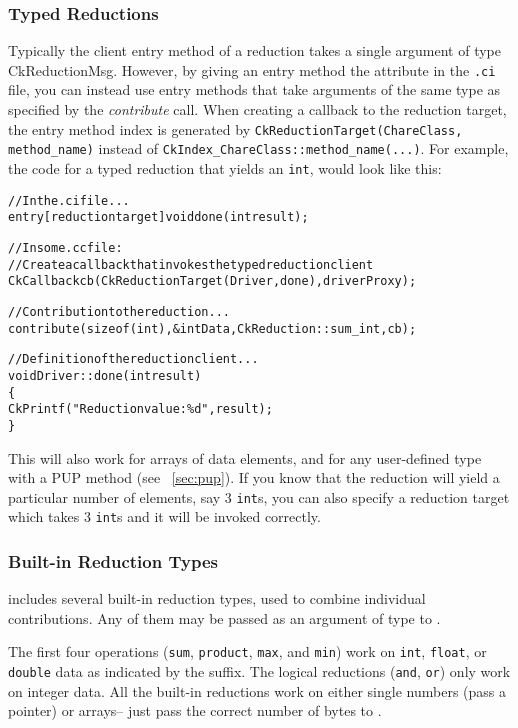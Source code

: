 \subsubsection{Typed Reductions}

\label{typed_reductions}

Typically the client entry method of a reduction takes a single argument of
type CkReductionMsg. However, by giving an entry method the
 attribute in the {\tt .ci} file, you can instead use entry methods that take
arguments of the same type as specified by the {\em contribute} call.  
When creating a callback to the
reduction target, the entry method index is generated by 
{\tt CkReductionTarget(ChareClass, method\_name)} 
instead of {\tt CkIndex\_ChareClass::method\_name(...)}.
For example,
the code for a typed reduction that yields an {\tt int}, would look like this:

\begin{alltt}
  // In the .ci file...
  entry [reductiontarget] void done(int result);

  // In some .cc file: 
  // Create a callback that invokes the typed reduction client
  CkCallback cb(CkReductionTarget(Driver,done), driverProxy);

  // Contribution to the reduction...
  contribute(sizeof(int), &intData, CkReduction::sum_int, cb);

  // Definition of the reduction client...
  void Driver::done(int result) 
  \{
    CkPrintf("Reduction value: \%d", result);
  \}
\end{alltt}

This will also work for arrays of data elements, and for any user-defined type with a PUP method
(see ~\ref{sec:pup}). If you know that the reduction will yield a particular
number of elements, say 3 {\tt int}s, you can also specify a reduction target which
takes 3 {\tt int}s and it will be invoked correctly. 

\subsubsection{Built-in Reduction Types}

\label{builtin_reduction}

\charmpp{} includes several built-in reduction types, used to combine 
individual contributions.  Any of them may be passed as an argument of type
 to .

The first four operations ({\tt sum}, {\tt product}, {\tt max}, and {\tt min}) work on {\tt int},
{\tt float}, or {\tt double} data as indicated by the suffix.  The logical
reductions ({\tt and}, {\tt or}) only work on integer data.  All the built-in
reductions work on either single numbers (pass a pointer) or arrays-- just
pass the correct number of bytes to .

